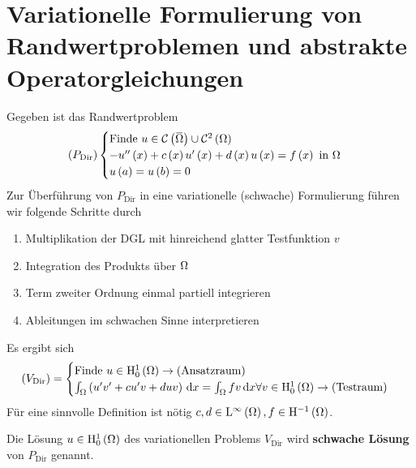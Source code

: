 \section{Variationelle Formulierung von Randwertproblemen und abstrakte Operatorgleichungen}
Gegeben ist das Randwertproblem
\begin{equation*}
	\left(P_{\text{Dir}}\right) \begin{cases}
		\text{Finde } u\in\C\left(\overbar{\W}\right)\cup\C^{2}\left(\W\right)\\
		-u^{\prime\prime}\left(x\right) + c\left(x\right)u^{\prime}\left(x\right) + d\left(x\right)u\left(x\right) = f\left(x\right) \text{ in } \W\\
		u\left(a\right)=u\left(b\right) = 0
	\end{cases}
\end{equation*}
Zur Überführung von $P_{\text{Dir}}$ in eine variationelle (schwache) Formulierung führen wir folgende Schritte durch
\begin{enumerate}
	\item Multiplikation der DGL mit hinreichend glatter Testfunktion $v$
	\item Integration des Produkts über $\Omega${}
	\item Term zweiter Ordnung einmal partiell integrieren
	\item Ableitungen im schwachen Sinne interpretieren
\end{enumerate}

Es ergibt sich
\begin{equation*}
	\left(V_{\text{Dir}}\right) = \begin{cases}
		\text{Finde } u\in\mathrm{H}^{1}_{0}\left(\Omega\right) \rightarrow \text{(Ansatzraum)}\\
		\int_{\Omega}\left(u^{\prime}v^{\prime}+cu^{\prime}v+duv\right)\,\mathrm{d} x = \int_{\Omega}fv\,\mathrm{d} x \forall v\in\mathrm{H}^{1}_{0}\left(\Omega\right) \rightarrow \text{(Testraum)}
	\end{cases}
\end{equation*}
Für eine sinnvolle Definition ist nötig $c,d\in\mathrm{L}^{\infty}\left(\Omega\right),f\in\mathrm{H}^{-1}\left(\Omega\right)$.{}

\begin{definition}
	Die Lösung $u\in\mathrm{H}^{1}_{0}\left(\Omega\right)$ des variationellen Problems $V_{\text{Dir}}$ wird \textbf{schwache Lösung} von $P_{\text{Dir}}$ genannt.
\end{definition}
